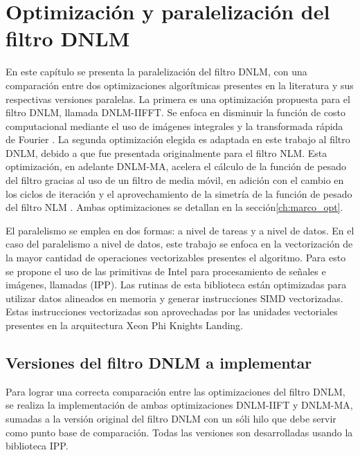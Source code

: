 \chapter{Optimizaci\'on y paralelizaci\'on del filtro DNLM}
\label{ch:solucion}

En este cap\'itulo se presenta la paralelizaci\'on del filtro DNLM, con una comparaci\'on entre dos optimizaciones algor\'itmicas presentes en la literatura y sus respectivas versiones paralelas. La primera es una optimizaci\'on propuesta para el filtro DNLM, llamada DNLM-IIFFT. Se enfoca en disminuir la funci\'on de costo computacional mediante el uso de im\'agenes integrales y la transformada r\'apida de Fourier \cite{CalderonRamirez2017}. La segunda optimizaci\'on elegida es adaptada en este trabajo al filtro DNLM, debido a que fue presentada originalmente para el filtro NLM. Esta optimizaci\'on, en adelante DNLM-MA, acelera el c\'alculo de la funci\'on de pesado del filtro gracias al uso de un filtro de media m\'ovil, en adici\'on con el cambio en los ciclos de iteraci\'on y el aprovechamiento de la simetr\'ia de la funci\'on de pesado del filtro NLM \cite{Condat2010}. Ambas optimizaciones se detallan en la secci\'on\ref{ch:marco_opt}.

El paralelismo se emplea en dos formas: a nivel de tareas y a nivel de datos. En el caso del paralelismo a nivel de datos, este trabajo se enfoca en la vectorizaci\'on de la mayor cantidad de operaciones vectorizables presentes el algoritmo. Para esto se propone el uso de las primitivas de Intel para procesamiento de se\~nales e im\'agenes, llamadas  (IPP). Las rutinas de esta biblioteca est\'an optimizadas para utilizar datos alineados en memoria y generar instrucciones SIMD vectorizadas. Estas instrucciones vectorizadas son aprovechadas por las unidades vectoriales presentes en la arquitectura Xeon Phi Knights Landing.



\section{Versiones del filtro DNLM a implementar}

Para lograr una correcta comparaci\'on entre las optimizaciones del filtro DNLM, se realiza la implementaci\'on de ambas optimizaciones DNLM-IIFT y DNLM-MA, sumadas a la versi\'on original del filtro DNLM con un s\'oli hilo que debe servir como punto base de comparaci\'on. Todas las versiones son desarrolladas usando la biblioteca IPP.

